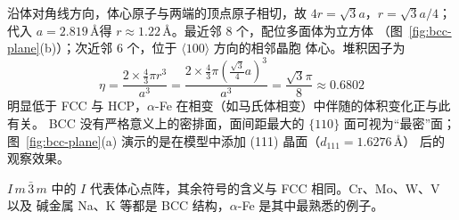 沿体对角线方向，体心原子与两端的顶点原子相切，故 $4r=\sqrt{3}a$，$r=\sqrt{3}a/4$；
代入 $a=2.819$\,\AA 得 $r\approx1.22$\,\AA。最近邻 8 个，配位多面体为立方体
（图~\ref{fig:bcc-plane}(b)）；次近邻 6 个，位于 $\langle100\rangle$ 方向的相邻晶胞
体心。堆积因子为
\begin{equation}
  \eta=\frac{2\times\frac{4}{3}\pi r^3}{a^3}
    =\frac{2\times\frac{4}{3}\pi\left(\frac{\sqrt{3}}{4}a\right)^3}{a^3}
    =\frac{\sqrt{3}\pi}{8}\approx0.6802
\end{equation}
明显低于 FCC 与 HCP，$\alpha$-Fe 在相变（如马氏体相变）中伴随的体积变化正与此有关。
BCC 没有严格意义上的密排面，面间距最大的 $\{110\}$ 面可视为``最密''面；
图~\ref{fig:bcc-plane}(a) 演示的是在模型中添加 (111) 晶面（$d_{111}=1.6276$\,\AA）
后的观察效果。

$I\,m\,\bar3\,m$ 中的 $I$ 代表体心点阵，其余符号的含义与 FCC 相同。Cr、Mo、W、V 以及
碱金属 Na、K 等都是 BCC 结构，$\alpha$-Fe 是其中最熟悉的例子。
